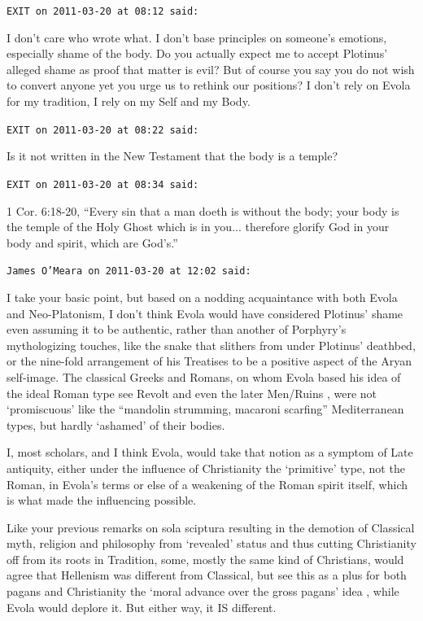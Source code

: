 \begin{footnotesize}
\begin{sffamily}
\texttt{EXIT on 2011-03-20 at 08:12 said:}

I don't care who wrote what. I don't base principles on someone's emotions, especially shame of the body. Do you actually expect me to accept Plotinus' alleged shame as proof that matter is evil? But of course you say you do not wish to convert anyone yet you urge us to rethink our positions? I don't rely on Evola for my tradition, I rely on my Self and my Body.

\hfill

\texttt{EXIT on 2011-03-20 at 08:22 said:}

Is it not written in the New Testament that the body is a temple?

\hfill

\texttt{EXIT on 2011-03-20 at 08:34 said:}

1 Cor. 6:18-20, ``Every sin that a man doeth is without the body; your body is the temple of the Holy Ghost which is in you... therefore glorify God in your body and spirit, which are God's.''

\hfill

\texttt{James O'Meara on 2011-03-20 at 12:02 said:}

I take your basic point, but based on a nodding acquaintance with both Evola and Neo-Platonism, I don't think Evola would have considered Plotinus' shame even assuming it to be authentic, rather than another of Porphyry's mythologizing touches, like the snake that slithers from under Plotinus' deathbed, or the nine-fold arrangement of his Treatises to be a positive aspect of the Aryan self-image. The classical Greeks and Romans, on whom Evola based his idea of the ideal Roman type see Revolt and even the later Men/Ruins , were not `promiscuous' like the ``mandolin strumming, macaroni scarfing'' Mediterranean types, but hardly `ashamed' of their bodies.

I, most scholars, and I think Evola, would take that notion as a symptom of Late antiquity, either under the influence of Christianity the `primitive' type, not the Roman, in Evola's terms or else of a weakening of the Roman spirit itself, which is what made the influencing possible.

Like your previous remarks on sola sciptura resulting in the demotion of Classical myth, religion and philosophy from `revealed' status and thus cutting Christianity off from its roots in Tradition, some, mostly the same kind of Christians, would agree that Hellenism was different from Classical, but see this as a plus for both pagans and Christianity the `moral advance over the gross pagans' idea , while Evola would deplore it. But either way, it IS different.


\end{sffamily}
\end{footnotesize}
